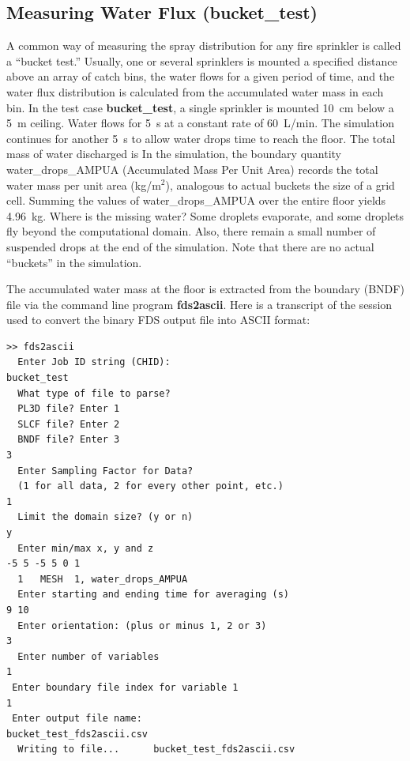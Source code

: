 \documentclass[11pt]{book}
\begin{document}
\clearpage

\subsection{Measuring Water Flux ({\bf bucket\_test}) }

A common way of measuring the spray distribution for any fire sprinkler is called a ``bucket test.''  Usually, one or several sprinklers is
mounted a specified distance above an array of catch bins, the water flows for a given period of time, and the water flux distribution is calculated
from the accumulated water mass in each bin. In the test case {\bf bucket\_test}, a single sprinkler is mounted 10~cm below a 5~m ceiling. Water
flows for 5~s at a constant rate of 60~L/min.  The simulation continues for another 5~s to allow water drops time to reach the
floor. The total mass of water discharged is
\be
\ee
In the simulation, the boundary quantity {\ct water\_drops\_AMPUA} (Accumulated Mass Per Unit Area) records the total water mass per unit area (kg/m$^2$), analogous to
actual buckets the size of a grid cell.
Summing the values of {\ct water\_drops\_AMPUA} over the entire floor yields 4.96~kg. Where is the missing water? Some droplets evaporate, and some droplets
fly beyond the computational domain. Also, there remain a small number of suspended drops at the end of the simulation. Note that
there are no actual ``buckets'' in the simulation.

The accumulated water mass at the floor is extracted from the boundary ({\ct BNDF}) file via the command line program {\bf fds2ascii}. Here is a transcript of the session
used to convert the binary FDS output file into ASCII format:

\footnotesize
\begin{verbatim}
>> fds2ascii
  Enter Job ID string (CHID):
bucket_test
  What type of file to parse?
  PL3D file? Enter 1
  SLCF file? Enter 2
  BNDF file? Enter 3
3
  Enter Sampling Factor for Data?
  (1 for all data, 2 for every other point, etc.)
1
  Limit the domain size? (y or n)
y
  Enter min/max x, y and z
-5 5 -5 5 0 1
  1   MESH  1, water_drops_AMPUA
  Enter starting and ending time for averaging (s)
9 10
  Enter orientation: (plus or minus 1, 2 or 3)
3
  Enter number of variables
1
 Enter boundary file index for variable 1
1
 Enter output file name:
bucket_test_fds2ascii.csv
  Writing to file...      bucket_test_fds2ascii.csv
\end{verbatim}
\end{document}

